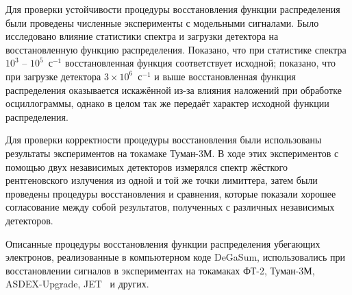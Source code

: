 Для проверки устойчивости процедуры восстановления функции распределения были проведены численные эксперименты с модельными сигналами. Было исследовано влияние статистики спектра и загрузки детектора на восстановленную функцию распределения. Показано, что при статистике спектра $10^3$ -- $10^5$~с${}^{-1}$ восстановленная функция соответствует исходной; показано, что при загрузке детектора $3 \times 10^6$~с${}^{-1}$ и выше восстановленная функция распределения оказывается искажённой из-за влияния наложений при обработке осциллограммы, однако в целом так же передаёт характер исходной функции распределения. 

Для проверки корректности процедуры восстановления были использованы результаты экспериментов на токамаке Туман-3М. В ходе этих экспериментов с помощью двух независимых детекторов измерялся спектр жёсткого рентгеновского излучения из одной и той же точки лимиттера, затем были проведены процедуры восстановления и сравнения, которые показали хорошее согласование между собой результатов, полученных с различных независимых детекторов.

Описанные процедуры восстановления функции распределения убегающих электронов, реализованные в компьютерном коде DeGaSum, использовались при восстановлении сигналов в экспериментах на токамаках ФТ-2, Туман-3М, ASDEX-Upgrade, JET~\cite{Shevelev2016,Shevelev2017,Shevelev2018,Shevelev2013,Iliasova2020,Reux2015,Shevelev2021} и других.


\FloatBarrier
